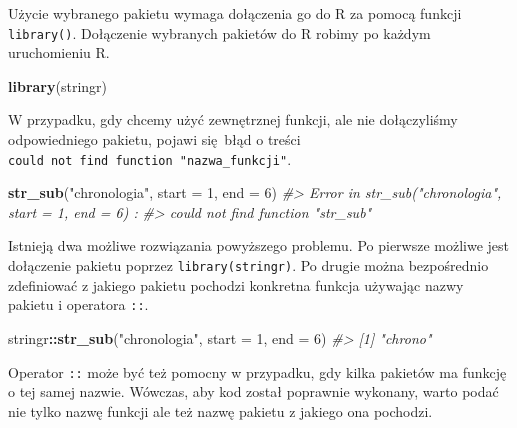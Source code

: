 \documentclass[paper=6in:9in,pagesize=pdftex,headinclude=on,footinclude=on,10pt]{scrbook}
\makeatletter
\newenvironment{Shaded}{\begin{snugshade}}{\end{snugshade}}
\newcommand{\CommentTok}[1]{\textcolor[rgb]{0.56,0.35,0.01}{\textit{#1}}}
\newcommand{\DataTypeTok}[1]{\textcolor[rgb]{0.13,0.29,0.53}{#1}}
\newcommand{\DecValTok}[1]{\textcolor[rgb]{0.00,0.00,0.81}{#1}}
\newcommand{\KeywordTok}[1]{\textcolor[rgb]{0.13,0.29,0.53}{\textbf{#1}}}
\newcommand{\NormalTok}[1]{#1}
\newcommand{\OperatorTok}[1]{\textcolor[rgb]{0.81,0.36,0.00}{\textbf{#1}}}
\newcommand{\StringTok}[1]{\textcolor[rgb]{0.31,0.60,0.02}{#1}}
\newenvironment{kframe}{%
\medskip{}
\setlength{\fboxsep}{.8em}
 \def\at@end@of@kframe{}%
 \ifinner\ifhmode%
  \def\at@end@of@kframe{\end{minipage}}%
  \begin{minipage}{\columnwidth}%
 \fi\fi%
 \def\FrameCommand##1{\hskip\@totalleftmargin \hskip-\fboxsep
 \colorbox{shadecolor}{##1}\hskip-\fboxsep
     \hskip-\linewidth \hskip-\@totalleftmargin \hskip\columnwidth}%
 \MakeFramed {\advance\hsize-\width
   \@totalleftmargin\z@ \linewidth\hsize
   \@setminipage}}%
 {\par\unskip\endMakeFramed%
 \at@end@of@kframe}
\newenvironment{rmdblock}[1]
  {
  \begin{itemize}
  \renewcommand{\labelitemi}{
    \raisebox{-.7\height}[0pt][0pt]{
      {\setkeys{Gin}{width=3em,keepaspectratio}\texttt{[image: images/\#1]}}
    }
  }
  \setlength{\fboxsep}{1em}
  \begin{kframe}
  \item
  }
  {
  \end{kframe}
  \end{itemize}
  }
\newenvironment{rmdinfo}
  {\begin{rmdblock}{compass}}
  {\end{rmdblock}}
\makeatother
\begin{document}
Użycie wybranego pakietu wymaga dołączenia go do R za pomocą funkcji \texttt{library()}.
Dołączenie wybranych pakietów do R robimy po każdym uruchomieniu R.

\begin{Shaded}
\begin{Highlighting}[]
\KeywordTok{library}\NormalTok{(stringr)}
\end{Highlighting}
\end{Shaded}

W przypadku, gdy chcemy użyć zewnętrznej funkcji, ale nie dołączyliśmy odpowiedniego pakietu, pojawi się~błąd o treści \texttt{could\ not\ find\ function\ "nazwa\_funkcji"}.

\begin{Shaded}
\begin{Highlighting}[]
\KeywordTok{str_sub}\NormalTok{(}\StringTok{"chronologia"}\NormalTok{, }\DataTypeTok{start =} \DecValTok{1}\NormalTok{, }\DataTypeTok{end =} \DecValTok{6}\NormalTok{)}
\CommentTok{#> Error in str_sub("chronologia", start = 1, end = 6) : }
\CommentTok{#>  could not find function "str_sub"}
\end{Highlighting}
\end{Shaded}

Istnieją dwa możliwe rozwiązania powyższego problemu.
Po pierwsze możliwe jest dołączenie pakietu poprzez \texttt{library(stringr)}.
Po drugie można bezpośrednio zdefiniować z jakiego pakietu pochodzi konkretna funkcja używając nazwy pakietu i operatora \texttt{::}.

\begin{Shaded}
\begin{Highlighting}[]
\NormalTok{stringr}\OperatorTok{::}\KeywordTok{str_sub}\NormalTok{(}\StringTok{"chronologia"}\NormalTok{, }\DataTypeTok{start =} \DecValTok{1}\NormalTok{, }\DataTypeTok{end =} \DecValTok{6}\NormalTok{)}
\CommentTok{#> [1] "chrono"}
\end{Highlighting}
\end{Shaded}

\begin{rmdinfo}
\begin{rmdinfo}

Operator \texttt{::} może być też pomocny w przypadku, gdy kilka pakietów ma funkcję o tej samej nazwie.
Wówczas, aby kod został poprawnie wykonany, warto podać nie tylko nazwę funkcji ale też nazwę pakietu z jakiego ona pochodzi.

\end{rmdinfo}
\end{rmdinfo}
\end{document}
